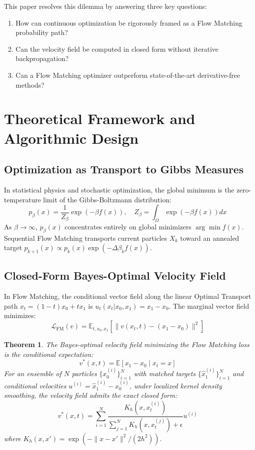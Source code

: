 \documentclass[10pt,journal,compsoc]{IEEEtran}
\newtheorem{theorem}{Theorem}
\begin{document}
This paper resolves this dilemma by answering three key questions:
\begin{enumerate}\setlength{\itemsep}{1pt}\setlength{\parskip}{0pt}
    \item How can continuous optimization be rigorously framed as a Flow Matching probability path?
    \item Can the velocity field be computed in closed form without iterative backpropagation?
    \item Can a Flow Matching optimizer outperform state-of-the-art derivative-free methods?
\end{enumerate}

\section{Theoretical Framework and Algorithmic Design}

\subsection{Optimization as Transport to Gibbs Measures}
In statistical physics and stochastic optimization, the global minimum is the zero-temperature limit of the Gibbs-Boltzmann distribution:
\begin{equation}
p_\beta(x) = \frac{1}{Z_\beta} \exp(-\beta f(x)), \quad Z_\beta = \int_\Omega \exp(-\beta f(x)) dx
\end{equation}
As $\beta \to \infty$, $p_\beta(x)$ concentrates entirely on global minimizers $\arg\min f(x)$. Sequential Flow Matching transports current particles $X_k$ toward an annealed target $p_{k+1}(x) \propto p_k(x) \exp(-\Delta \beta_k f(x))$.

\subsection{Closed-Form Bayes-Optimal Velocity Field}
In Flow Matching, the conditional vector field along the linear Optimal Transport path $x_t = (1-t)x_0 + t x_1$ is $u_t(x_t | x_0, x_1) = x_1 - x_0$. The marginal vector field minimizes:
\begin{equation}
\mathcal{L}_{\text{FM}}(v) = \mathbb{E}_{t, x_0, x_1} [\|v(x_t, t) - (x_1 - x_0)\|^2]
\end{equation}

\begin{theorem}
The Bayes-optimal velocity field minimizing the Flow Matching loss is the conditional expectation:
\begin{equation}
v^*(x, t) = \mathbb{E}[x_1 - x_0 \mid x_t = x]
\end{equation}
For an ensemble of $N$ particles $\{x_0^{(i)}\}_{i=1}^N$ with matched targets $\{\hat{x}_1^{(i)}\}_{i=1}^N$ and conditional velocities $u^{(i)} = \hat{x}_1^{(i)} - x_0^{(i)}$, under localized kernel density smoothing, the velocity field admits the exact closed form:
\begin{equation}
v^*(x, t) = \sum_{i=1}^N \frac{K_h(x, x_t^{(i)})}{\sum_{j=1}^N K_h(x, x_t^{(j)}) + \epsilon} u^{(i)}
\end{equation}
where $K_h(x, x') = \exp(-\|x - x'\|^2 / (2h^2))$.
\end{theorem}
\end{document}
